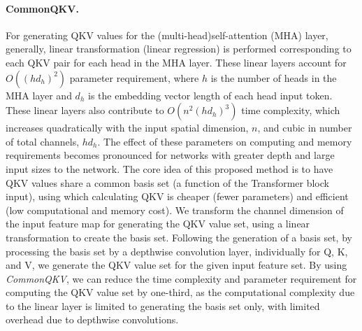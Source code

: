 \documentclass{article}
\begin{document}
\paragraph{CommonQKV.} \label{CQ} For generating QKV values for the (multi-head)self-attention (MHA) layer, generally, linear transformation (linear regression) is performed corresponding to each QKV pair for each head in the MHA layer. These linear layers account for $O((hd_{h})^{2})$ parameter requirement, where $h$ is the number of heads in the MHA layer and $d_{h}$ is the embedding vector length of each head input token. These linear layers also contribute to $O(n^2(hd_h)^3)$ time complexity, which increases quadratically with the input spatial dimension, $n$, and cubic in number of total channels, $hd_h$. The effect of these parameters on computing and memory requirements becomes pronounced for networks with greater depth and large input sizes to the network. The core idea of this proposed method is to have QKV values share a common basis set (a function of the Transformer block input), using which calculating QKV is cheaper (fewer parameters) and efficient (low computational and memory cost). We transform the channel dimension of the input feature map for generating the QKV value set, using a linear transformation to create the basis set. Following the generation of a basis set, by processing the basis set by a depthwise convolution layer, individually for Q, K, and V, we generate the QKV value set for the given input feature set. By using \textit{CommonQKV}, we can reduce the time complexity and parameter requirement for computing the QKV value set by one-third, as the computational complexity due to the linear layer is limited to generating the basis set only, with limited overhead due to depthwise convolutions. 
\end{document}
